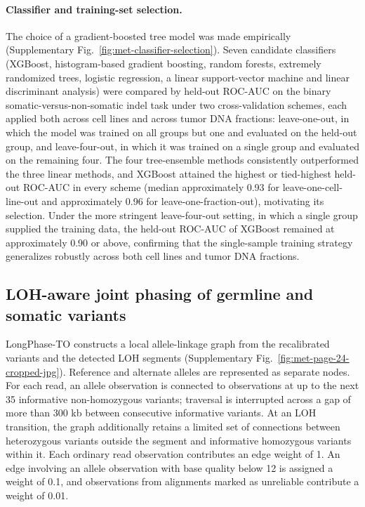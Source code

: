 \documentclass[pdflatex,sn-nature]{sn-jnl}
\begin{document}
\paragraph{Classifier and training-set selection.} The choice of a gradient-boosted tree model was made empirically (Supplementary Fig.~\ref{fig:met-classifier-selection}). Seven candidate classifiers (XGBoost, histogram-based gradient boosting, random forests, extremely randomized trees, logistic regression, a linear support-vector machine and linear discriminant analysis) were compared by held-out ROC-AUC on the binary somatic-versus-non-somatic indel task under two cross-validation schemes, each applied both across cell lines and across tumor DNA fractions: leave-one-out, in which the model was trained on all groups but one and evaluated on the held-out group, and leave-four-out, in which it was trained on a single group and evaluated on the remaining four. The four tree-ensemble methods consistently outperformed the three linear methods, and XGBoost attained the highest or tied-highest held-out ROC-AUC in every scheme (median approximately 0.93 for leave-one-cell-line-out and approximately 0.96 for leave-one-fraction-out), motivating its selection. Under the more stringent leave-four-out setting, in which a single group supplied the training data, the held-out ROC-AUC of XGBoost remained at approximately 0.90 or above, confirming that the single-sample training strategy generalizes robustly across both cell lines and tumor DNA fractions.


\subsection{LOH-aware joint phasing of germline and somatic variants}
\label{supp:loh-aware-phasing}

LongPhase-TO constructs a local allele-linkage graph from the recalibrated variants and the detected LOH segments (Supplementary Fig.~\ref{fig:met-page-24-cropped-jpg}). Reference and alternate alleles are represented as separate nodes. For each read, an allele observation is connected to observations at up to the next 35 informative non-homozygous variants; traversal is interrupted across a gap of more than 300 kb between consecutive informative variants. At an LOH transition, the graph additionally retains a limited set of connections between heterozygous variants outside the segment and informative homozygous variants within it. Each ordinary read observation contributes an edge weight of 1. An edge involving an allele observation with base quality below 12 is assigned a weight of 0.1, and observations from alignments marked as unreliable contribute a weight of 0.01.
\end{document}
